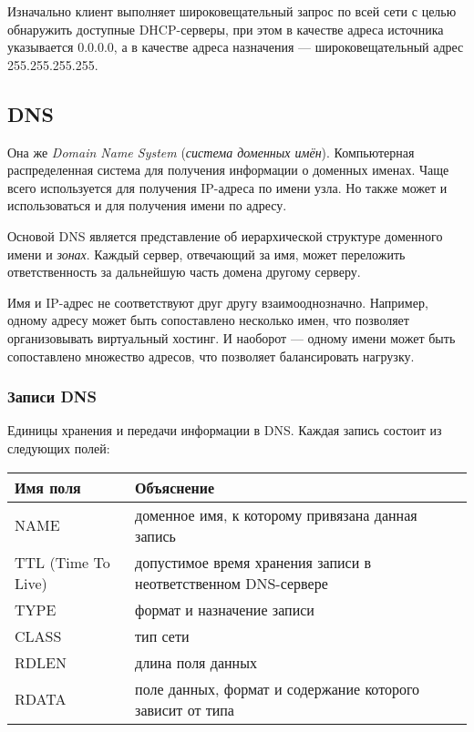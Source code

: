 Изначально клиент выполняет широковещательный запрос по всей сети с целью обнаружить доступные DHCP-серверы, при этом в качестве адреса источника указывается 0.0.0.0, а в качестве адреса назначения --- широковещательный адрес 255.255.255.255.

\subsection{DNS}
Она же \emph{Domain Name System} (\emph{система доменных имён}). Компьютерная распределенная система для получения информации о доменных именах. Чаще всего используется для получения IP-адреса по имени узла. Но также может и использоваться и для получения имени по адресу.

Основой DNS является представление об иерархической структуре доменного имени и \emph{зонах}. Каждый сервер, отвечающий за имя, может переложить ответственность за дальнейшую часть домена другому серверу.

Имя и IP-адрес не соответствуют друг другу взаимооднозначно. Например, одному адресу может быть сопоставлено несколько имен, что позволяет организовывать виртуальный хостинг. И наоборот --- одному имени может быть сопоставлено множество адресов, что позволяет балансировать нагрузку.

\subsubsection{Записи DNS}
Единицы хранения и передачи информации в DNS. Каждая запись состоит из следующих полей:

\begin{center}
  \begin{tabular}{lp{9cm}}
    \toprule
    Имя поля & Объяснение \\
    \midrule
    NAME & доменное имя, к которому привязана данная запись \\
    TTL (Time To Live) & допустимое время хранения записи в неответственном DNS-сервере \\
    TYPE & формат и назначение записи \\
    CLASS & тип сети \\
    RDLEN & длина поля данных \\
    RDATA & поле данных, формат и содержание которого зависит от типа \\
    \bottomrule
  \end{tabular}
\end{center}

